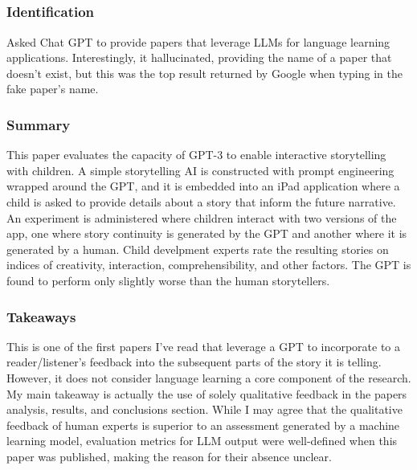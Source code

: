 \documentclass[
	letterpaper, %
]{jdf}
\begin{document}
\subsection{}
\subsubsection{Identification}
Asked Chat GPT to provide papers that leverage LLMs for language learning applications. Interestingly, it hallucinated, providing the name of a paper that doesn't exist, but this was the top result returned by Google when typing in the fake paper's name.

\subsubsection{Summary}
This paper evaluates the capacity of GPT-3 to enable interactive storytelling with children. A simple storytelling AI is constructed with prompt engineering wrapped around the GPT, and it is embedded into an iPad application where a child is asked to provide details about a story that inform the future narrative. An experiment is administered where children interact with two versions of the app, one where story continuity is generated by the GPT and another where it is generated by a human. Child develpment experts rate the resulting stories on indices of creativity, interaction, comprehensibility, and other factors. The GPT is found to perform only slightly worse than the human storytellers.

\subsubsection{Takeaways}
This is one of the first papers I've read that leverage a GPT to incorporate to a reader/listener's feedback into the subsequent parts of the story it is telling. However, it does not consider language learning a core component of the research. My main takeaway is actually the use of solely qualitative feedback in the papers analysis, results, and conclusions section. While I may agree that the qualitative feedback of human experts is superior to an assessment generated by a machine learning model, evaluation metrics for LLM output were well-defined when this paper was published, making the reason for their absence unclear.
\end{document}
